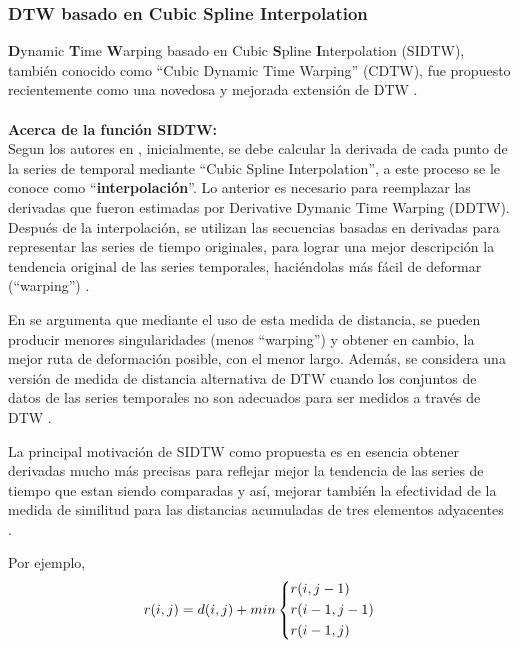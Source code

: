 \subsubsection{\textbf{DTW basado en Cubic Spline Interpolation}}
\textbf{D}ynamic \textbf{T}ime \textbf{W}arping basado en Cubic \textbf{S}pline \textbf{I}nterpolation (SIDTW), tambi\'en conocido como \enquote{Cubic Dynamic Time Warping} (CDTW),  fue propuesto recientemente como una novedosa y mejorada extensi\'on de DTW \cite{DTWcubicsplineinterpolation}.\\\\
\textbf{Acerca de la funci\'on SIDTW:}\\
Segun los autores en \cite{DTWcubicsplineinterpolation}, inicialmente, se debe calcular la derivada de cada punto de la series de temporal mediante \enquote{Cubic Spline Interpolation}, a este proceso se le conoce como \enquote{\textbf{interpolaci\'on}}. Lo anterior es necesario para reemplazar las derivadas que fueron estimadas por Derivative Dymanic Time Warping (DDTW). Despu\'es de la interpolaci\'on, se utilizan las secuencias basadas en derivadas para representar las series de tiempo originales, para lograr una mejor descripci\'on la tendencia original de las series temporales, haci\'endolas m\'as f\'acil de deformar (\enquote{warping}) \cite{DTWcubicsplineinterpolation}.\par
En \cite{DTWcubicsplineinterpolation} se argumenta que mediante el uso de esta medida de distancia, se pueden producir menores singularidades (menos \enquote{warping}) y obtener en cambio, la mejor ruta de deformaci\'on posible, con el menor largo. Adem\'as, se considera una versi\'on de medida de distancia alternativa de DTW cuando los conjuntos de datos de las series temporales no son adecuados para ser medidos a trav\'es de DTW \cite{DTWcubicsplineinterpolation}.\par
La principal motivaci\'on de SIDTW como propuesta es en esencia obtener derivadas mucho m\'as precisas para reflejar mejor la tendencia de las series de tiempo que estan siendo comparadas y as\'i, mejorar tambi\'en la efectividad de la medida de similitud para las distancias acumuladas de tres elementos adyacentes \cite{DTWcubicsplineinterpolation}.\par
Por ejemplo,
\[
	{r(i,j) = d(i,j) + min}
\begin{dcases}
    {r(i,j - 1)}	\\
    {r(i - 1,j - 1)}\\
    {r(i - 1,j)}    \\
\end{dcases}
\]
